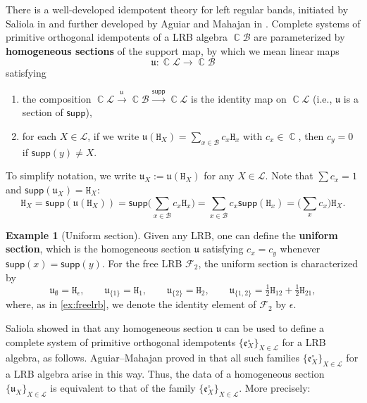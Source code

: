 \documentclass[11pt, oneside, reqno]{amsart}
\theoremstyle{definition}
\newtheorem{example}[theorem]{Example}
\numberwithin{equation}{section}
\DeclareMathOperator{\C}{\mathbb{C}}
\newcommand{\defn}[1]{{\color{RoyalBlue}\bf#1}}
\def \BB{{\mathcal{B}}}
\def \kk{\C}
\def \lat{{\mathcal{L}}}
\def \uu{{\mathfrak{u}}}
\def \ee{{\mathfrak{e}}}
\def \supp{\mathsf{supp}}
\newcommand{\B}[1]{\mathtt{#1}} 			%
\begin{document}
There is a well-developed idempotent theory for left regular bands, initiated
by Saliola in \cite{sal2008quiv,saliola2009face,saliola2012eigenvectors} and
further developed by Aguiar and Mahajan in \cite{am17}.
Complete systems of primitive orthogonal idempotents of a LRB algebra $\kk \BB$
are parameterized by \defn{homogeneous sections} of the support map,
by which we mean linear maps
\[ \uu: \kk \lat \to \kk \BB \]
satisfying
\begin{enumerate}
    \item
        the composition
        $\kk \lat \xrightarrow{\uu} \kk \BB  \xrightarrow{\supp} \kk \lat$
        is the identity map on $\kk \lat$ (i.e., $\uu$ is a section
        of $\supp$),

    \item
        for each $X \in \lat$, if we write
        $\uu(\B{H}_X) = \sum_{x \in \BB} c_x \B{H}_x$ with $c_x \in \kk$,
        then $c_y = 0$ if $\supp(y) \neq X$.
\end{enumerate}
To simplify notation, we write $\uu_X:= \uu(\B{H}_X)$ for any $X \in \lat$.
Note that $\sum c_x = 1$ and $\supp(\uu_X) = \B{H}_X$:
\begin{equation*}
    \B{H}_X
    = \supp \left(\uu(\B{H}_X)\right)
    = \supp \Big(\sum_{x \in \BB} c_x \B{H}_x\Big)
    = \sum_{x \in \BB} c_x \supp(\B{H}_x)
    = \Big(\sum_{x} c_x\Big) \B{H}_X.
\end{equation*}

\begin{example}[Uniform section]\label{ex:uniformsection} \rm
Given any LRB, one can define the \defn{uniform section}, which is the
homogeneous section $\uu$ satisfying $c_{x} = c_{y}$ whenever $\supp(x)
= \supp(y)$. For the free LRB $\mathscr{F}_2$, the uniform section is
characterized by
\[
\uu_{\emptyset} = \B{H}_{\epsilon}, \qquad
\uu_{\{ 1 \} } = \B{H}_{1},\qquad
\uu_{\{ 2 \}} = \B{H}_{2}, \qquad
\uu_{\{1,2 \}} = \tfrac{1}{2} \B{H}_{12} + \tfrac{1}{2}\B{H}_{21},
\]
where, as in \cref{ex:freelrb}, we denote the identity element of $\mathscr{F}_2$ by $\epsilon$.
\end{example}

Saliola showed in \cite{saliola07quiverLRB} that any homogeneous section $\uu$
can be used to define a complete system of primitive orthogonal idempotents
$\{\ee^\circ_X \}_{X \in \lat}$ for a LRB algebra, as follows. Aguiar--Mahajan
proved in \cite[Prop. 11.9]{am17} that all such families $\{\ee^\circ_X \}_{X \in
\lat}$ for a LRB algebra arise in this way.
Thus, the data of a homogeneous section $\{\uu_{X}\}_{X \in \lat}$ is equivalent to that of the
family $\{ \ee^\circ_X \}_{X \in \lat}$. More precisely:
\end{document}

